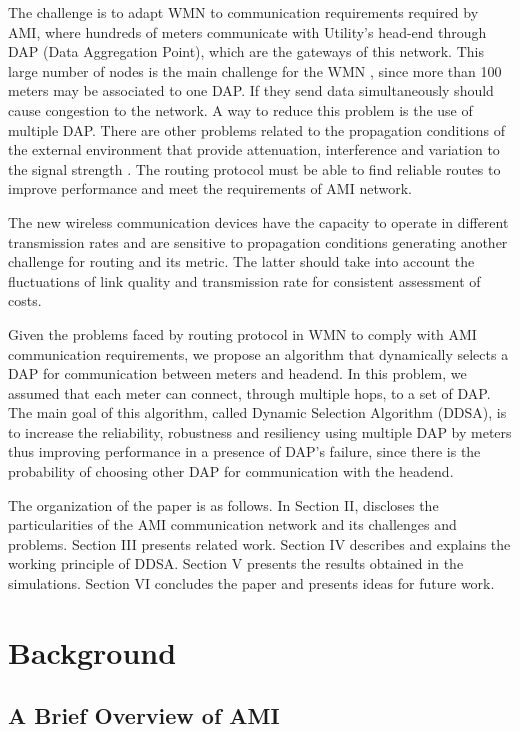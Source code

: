 \documentclass[conference]{IEEEtran}
\begin{document}
The challenge is to adapt WMN to communication requirements required by AMI, where hundreds of meters communicate with Utility's head-end through DAP (Data Aggregation Point), which are the gateways of this network. This large number of nodes is the main challenge for the WMN \cite{Akyildiz2005}, since more than 100 meters may be associated to one DAP. If they  send data simultaneously should cause congestion to the network. A way to reduce this problem is the use of multiple DAP. There are other problems related to the propagation conditions of the external environment that provide attenuation, interference and variation to the signal strength \cite{Gungor2011}. The routing protocol must be able to find reliable routes to improve performance and meet the requirements of AMI network.

The new wireless communication devices have the capacity to operate in different transmission rates and are sensitive to propagation conditions generating another challenge for routing and its metric. The latter should take into account the fluctuations of link quality and transmission
rate for consistent assessment of costs.

Given the problems faced by routing protocol in WMN to comply with AMI communication requirements, we propose an algorithm that dynamically selects a DAP for communication between meters and headend. In this problem, we assumed that each meter can connect, through multiple hops, to a set of DAP. The main goal of this algorithm, called Dynamic Selection Algorithm (DDSA), is to increase the reliability, robustness and resiliency using multiple DAP by meters thus improving performance in a presence of DAP's failure, since there is the probability of choosing other DAP for communication with the headend.

The organization of the paper is as follows. In Section II, discloses the particularities of the AMI communication network and its challenges and problems. Section III presents related work. Section IV describes and explains the working principle of DDSA. Section V presents the results obtained in the simulations. Section VI concludes the paper and presents ideas for future work.



\section{Background}

\subsection{A Brief Overview of AMI}
\end{document}
